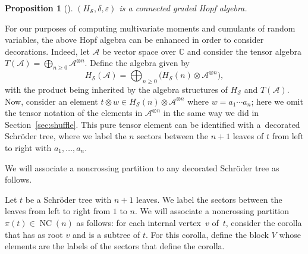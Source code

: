 \documentclass[pdftex]{sigma}%
\numberwithin{equation}{section}
\newtheorem{Proposition}[Theorem]{Proposition}
 { \theoremstyle{definition}
\newtheorem{Definition}[Theorem]{Definition}
\newtheorem{Example}[Theorem]{Example}
\newtheorem{Remark}[Theorem]{Remark} }
\newcommand{\A}{\mathcal{A}}
\newcommand{\NC}{\operatorname{NC}}
\newcommand{\cHS}{H_\mathcal{S}}
\begin{document}
\begin{Proposition}[\cite{JMNT}]
$(\cHS,\delta,\varepsilon)$ is a connected graded Hopf algebra.
\end{Proposition}

For our purposes of computing multivariate moments and cumulants of random variables, the above Hopf algebra can be enhanced in order to consider decorations. Indeed, let $\A$ be vector space over $\mathbb{C}$ and consider the tensor algebra $T(\A) = \bigoplus_{n\geq0} \A^{\otimes n}$. Define the algebra given by
\[
	\cHS(\A) = \bigoplus_{n\geq0} \big(\cHS(n) \otimes \A^{\otimes n}\big),
\]
with the product being inherited by the algebra structures of $\cHS$ and $T(\A)$. Now, consider an element $t\otimes w\in \cHS(n) \otimes \A^{\otimes n}$ where $w = a_1\cdots a_n$; here we omit the tensor notation of the elements in $\A^{\otimes n}$ in the same way we did in Section~\ref{sec:shuffle}. This pure tensor element can be identified with a~decorated Schr\"oder tree, where we label the $n$ sectors between the $n+1$ leaves of $t$ from left to right with $a_1,\dots, a_n$.

We will associate a noncrossing partition to any decorated Schr\"oder tree as follows.

\begin{Definition}\label{def:pit}
Let $t$ be a Schr\"oder tree with $n+1$ leaves. We label the sectors between the leaves from left to right from $1$ to $n$. We will associate a noncrossing partition $\pi(t) \in \NC(n)$ as follows: for each internal vertex~$v$ of~$t$, consider the corolla that has as root $v$ and is a subtree of $t$. For this corolla, define the block $V$ whose elements are the labels of the sectors that define the corolla.
\end{Definition}
\end{document}
